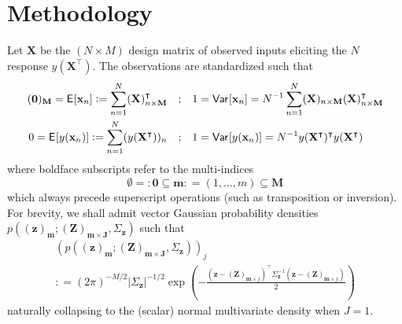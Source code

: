\documentclass[preprint,12pt]{elsarticle}
\newcommand*{\M}[1]{\ensuremath{#1}\xspace}
\newcommand*{\vr}[1]{\M{\mathbf{#1}}}
\newcommand*{\deq}{\M{\mathrel{\mathop:}=}}
\newcommand*{\deqr}{\M{=\mathrel{\mathop:}}}
\newcommand{\T}[1]{\text{#1}}
\newcommand*{\QT}[2][]{\M{\quad\T{#2}\ifthenelse{\equal{#1}{}}{\quad}{#1}}}
\newcommand*{\ev}[2][]{\mathsf{E}_{#1}\!\left\lbrack{} #2 \right\rbrack}
\newcommand*{\var}[2][]{\mathsf{Var}_{#1}\!\left\lbrack{} #2 \right\rbrack}
\newcommand*{\modulus}[1]{\M{\left\lvert#1\right\rvert}}
\begin{document}
    \section{Methodology} \label{sec:Method}
        Let $\vr{X}$ be the $(N \times M)$ design matrix of observed inputs eliciting the \M{N} response $y(\vr{X}^{\intercal})$. The observations are standardized such that
        \begin{align*}
            (\vr{0})_\vr{M} = \ev{\vr{x}_{n}} \deq \sum_{n=1}^{N} (\vr{X})_{n \times \vr{M}}^{\intercal} 
            &\QT{;} 1 = \var{\vr{x}_{n}} = N^{-1}\sum_{n=1}^{N} (\vr{X})_{n \times \vr{M}} (\vr{X})_{n \times \vr{M}}^{\intercal}
            \\
            0 = \ev{y(\vr{x}_{n})} \deq \sum_{n=1}^{N} (y(\vr{X}^{\intercal}))_{n} 
            &\QT{;} 1 = \var{y(\vr{x}_{n})} = N^{-1} y(\vr{X}^{\intercal})^{\intercal}y(\vr{X}^{\intercal})
        \end{align*}
        where boldface subscripts refer to the multi-indices
        \begin{equation} \label{eq:Method:MultiIndexDef}
            \emptyset \deqr \vr{0} \subseteq\vr{m}\deq(1,\ldots,m) \subseteq \vr{M}
        \end{equation}
        which always precede superscript operations (such as transposition or inversion). For brevity, we shall admit vector Gaussian probability densities $p\!\left((\vr{z})_{\vr{m}} ; (\vr{Z})_{\vr{m}\times\vr{J}}, \Sigma_{\vr{z}}\right)$ such that
        \begin{multline} \label{eq:Method:pDef}
            \left(p\!\left((\vr{z})_{\vr{m}} ; (\vr{Z})_{\vr{m}\times\vr{J}}, \Sigma_{\vr{z}}\right)\right)_{j} \\
            \deq (2 \pi)^{-M/2} \modulus{\Sigma_{\vr{z}}}^{-1/2} \exp\left(-\frac
            {(\vr{z}-(\vr{Z})_{\vr{m}\times j})^{\intercal} \Sigma_{\vr{z}}^{-1} (\vr{z}-(\vr{Z})_{\vr{m}\times j})}{2}
            \right)             
        \end{multline}
        naturally collapsing to the (scalar) normal multivariate density when $J=1$.
\end{document}
